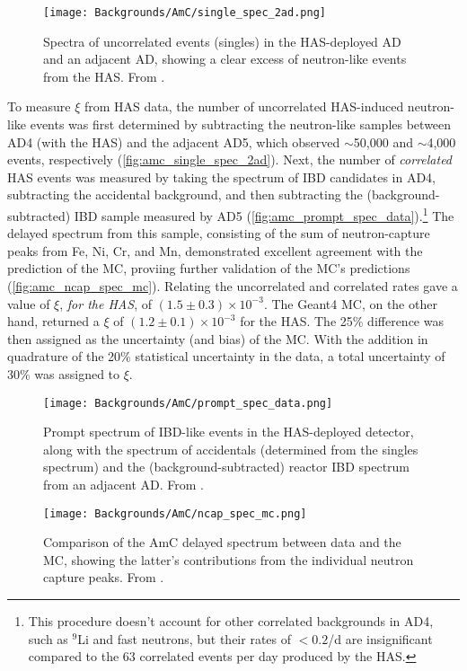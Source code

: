 \documentclass[../thesis.tex]{subfiles}
\begin{document}
\begin{figure}[ht]
  \texttt{[image: Backgrounds/AmC/single\_spec\_2ad.png]}
  \caption{Spectra of uncorrelated events (singles) in the HAS-deployed AD and an adjacent AD, showing a clear excess of neutron-like events from the HAS. From \cite{Gu_2016}.}
  \label{fig:amc_single_spec_2ad}
\end{figure}

To measure $\xi$ from HAS data, the number of uncorrelated HAS-induced neutron-like events was first determined by subtracting the neutron-like samples between AD4 (with the HAS) and the adjacent AD5, which observed $\sim$50,000 and $\sim$4,000 events, respectively (\autoref{fig:amc_single_spec_2ad}). Next, the number of \emph{correlated} HAS events was measured by taking the spectrum of IBD candidates in AD4, subtracting the accidental background, and then subtracting the (background-subtracted) IBD sample measured by AD5 (\autoref{fig:amc_prompt_spec_data}).\footnote{This procedure doesn't account for other correlated backgrounds in AD4, such as $^9$Li and fast neutrons, but their rates of $< 0.2$/d are insignificant compared to the 63 correlated events per day produced by the HAS.} The delayed spectrum from this sample, consisting of the sum of neutron-capture peaks from Fe, Ni, Cr, and Mn, demonstrated excellent agreement with the prediction of the MC, proviing further validation of the MC's predictions (\autoref{fig:amc_ncap_spec_mc}). Relating the uncorrelated and correlated rates gave a value of $\xi$, \emph{for the HAS}, of $(1.5\pm0.3)\times10^{-3}$. The Geant4 MC, on the other hand, returned a $\xi$ of $(1.2\pm0.1)\times10^{-3}$ for the HAS. The 25\% difference was then assigned as the uncertainty (and bias) of the MC. With the addition in quadrature of the 20\% statistical uncertainty in the data, a total uncertainty of 30\% was assigned to $\xi$.

\begin{figure}[ht]
  \texttt{[image: Backgrounds/AmC/prompt\_spec\_data.png]}
  \caption{Prompt spectrum of IBD-like events in the HAS-deployed detector, along with the spectrum of accidentals (determined from the singles spectrum) and the (background-subtracted) reactor IBD spectrum from an adjacent AD. From \cite{Gu_2016}.}
  \label{fig:amc_prompt_spec_data}
\end{figure}

\begin{figure}[ht]
  \texttt{[image: Backgrounds/AmC/ncap\_spec\_mc.png]}
  \caption{Comparison of the AmC delayed spectrum between data and the MC, showing the latter's contributions from the individual neutron capture peaks. From \cite{Gu_2016}.}
  \label{fig:amc_ncap_spec_mc}
\end{figure}
\end{document}
